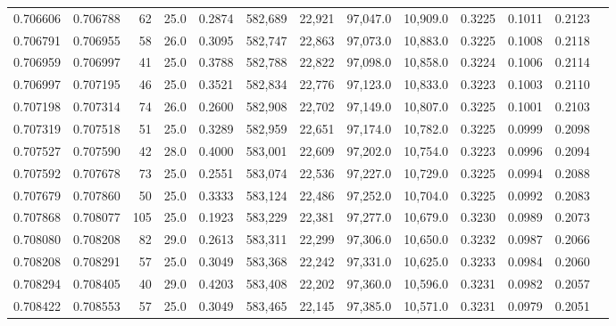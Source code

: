 \begin{tabular}{rrrrrrrrrrrrr}
0.706606 & 0.706788 &    62 & 25.0 &                                     0.2874 & 582,689 &  22,921 &  97,047.0 &  10,909.0 & 0.3225 & 0.1011 & 0.2123 \\
0.706791 & 0.706955 &    58 & 26.0 &                                     0.3095 & 582,747 &  22,863 &  97,073.0 &  10,883.0 & 0.3225 & 0.1008 & 0.2118 \\
0.706959 & 0.706997 &    41 & 25.0 &                                     0.3788 & 582,788 &  22,822 &  97,098.0 &  10,858.0 & 0.3224 & 0.1006 & 0.2114 \\
0.706997 & 0.707195 &    46 & 25.0 &                                     0.3521 & 582,834 &  22,776 &  97,123.0 &  10,833.0 & 0.3223 & 0.1003 & 0.2110 \\
0.707198 & 0.707314 &    74 & 26.0 &                                     0.2600 & 582,908 &  22,702 &  97,149.0 &  10,807.0 & 0.3225 & 0.1001 & 0.2103 \\
0.707319 & 0.707518 &    51 & 25.0 &                                     0.3289 & 582,959 &  22,651 &  97,174.0 &  10,782.0 & 0.3225 & 0.0999 & 0.2098 \\
0.707527 & 0.707590 &    42 & 28.0 &                                     0.4000 & 583,001 &  22,609 &  97,202.0 &  10,754.0 & 0.3223 & 0.0996 & 0.2094 \\
0.707592 & 0.707678 &    73 & 25.0 &                                     0.2551 & 583,074 &  22,536 &  97,227.0 &  10,729.0 & 0.3225 & 0.0994 & 0.2088 \\
0.707679 & 0.707860 &    50 & 25.0 &                                     0.3333 & 583,124 &  22,486 &  97,252.0 &  10,704.0 & 0.3225 & 0.0992 & 0.2083 \\
0.707868 & 0.708077 &   105 & 25.0 &                                     0.1923 & 583,229 &  22,381 &  97,277.0 &  10,679.0 & 0.3230 & 0.0989 & 0.2073 \\
0.708080 & 0.708208 &    82 & 29.0 &                                     0.2613 & 583,311 &  22,299 &  97,306.0 &  10,650.0 & 0.3232 & 0.0987 & 0.2066 \\
0.708208 & 0.708291 &    57 & 25.0 &                                     0.3049 & 583,368 &  22,242 &  97,331.0 &  10,625.0 & 0.3233 & 0.0984 & 0.2060 \\
0.708294 & 0.708405 &    40 & 29.0 &                                     0.4203 & 583,408 &  22,202 &  97,360.0 &  10,596.0 & 0.3231 & 0.0982 & 0.2057 \\
0.708422 & 0.708553 &    57 & 25.0 &                                     0.3049 & 583,465 &  22,145 &  97,385.0 &  10,571.0 & 0.3231 & 0.0979 & 0.2051 \\

\end{tabular}
